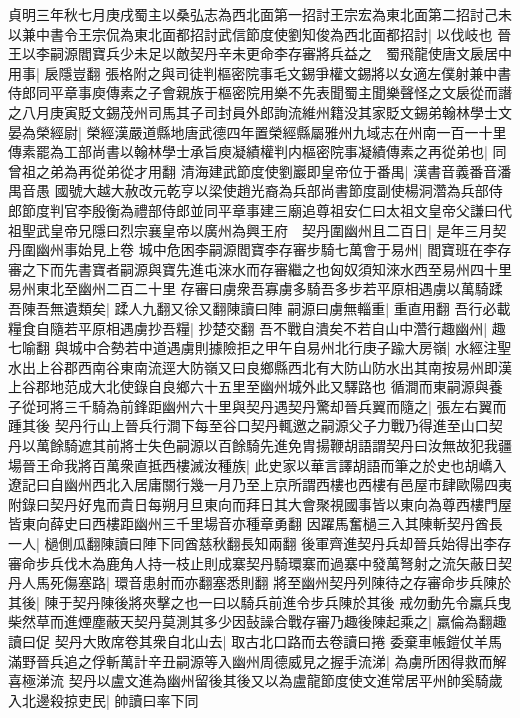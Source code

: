 貞明三年秋七月庚戌蜀主以桑弘志為西北面第一招討王宗宏為東北面第二招討己未以兼中書令王宗侃為東北面都招討武信節度使劉知俊為西北面都招討|{
	以伐岐也}
晉王以李嗣源閻寶兵少未足以敵契丹辛未更命李存審將兵益之　蜀飛龍使唐文扆居中用事|{
	扆隱豈翻}
張格附之與司徒判樞密院事毛文錫爭權文錫將以女適左僕射兼中書侍郎同平章事庾傳素之子會親族于樞密院用樂不先表聞蜀主聞樂聲怪之文扆從而譖之八月庚寅貶文錫茂州司馬其子司封員外郎詢流維州籍没其家貶文錫弟翰林學士文晏為榮經尉|{
	榮經漢嚴道縣地唐武德四年置榮經縣屬雅州九域志在州南一百一十里}
傳素罷為工部尚書以翰林學士承旨庾凝績權判内樞密院事凝績傳素之再從弟也|{
	同曾祖之弟為再從弟從才用翻}
清海建武節度使劉巖即皇帝位于番禺|{
	漢書音義番音潘禺音愚}
國號大越大赦改元乾亨以梁使趙光裔為兵部尚書節度副使楊洞濳為兵部侍郎節度判官李殷衡為禮部侍郎並同平章事建三廟追尊祖安仁曰太祖文皇帝父謙曰代祖聖武皇帝兄隱曰烈宗襄皇帝以廣州為興王府　契丹圍幽州且二百日|{
	是年三月契丹圍幽州事始見上卷}
城中危困李嗣源閻寶李存審步騎七萬會于易州|{
	閻寶班在李存審之下而先書寶者嗣源與寶先進屯淶水而存審繼之也匈奴須知淶水西至易州四十里易州東北至幽州二百二十里}
存審曰虜衆吾寡虜多騎吾多步若平原相遇虜以萬騎蹂吾陳吾無遺類矣|{
	蹂人九翻又徐又翻陳讀曰陣}
嗣源曰虜無輜重|{
	重直用翻}
吾行必載糧食自隨若平原相遇虜抄吾糧|{
	抄楚交翻}
吾不戰自潰矣不若自山中濳行趣幽州|{
	趣七喻翻}
與城中合勢若中道遇虜則據險拒之甲午自易州北行庚子踰大房嶺|{
	水經注聖水出上谷郡西南谷東南流逕大防嶺又曰良鄉縣西北有大防山防水出其南按易州即漢上谷郡地范成大北使錄自良鄉六十五里至幽州城外此又驛路也}
循澗而東嗣源與養子從珂將三千騎為前鋒距幽州六十里與契丹遇契丹驚却晉兵翼而隨之|{
	張左右翼而踵其後}
契丹行山上晉兵行澗下每至谷口契丹輒邀之嗣源父子力戰乃得進至山口契丹以萬餘騎遮其前將士失色嗣源以百餘騎先進免胄揚鞭胡語謂契丹曰汝無故犯我疆場晉王命我將百萬衆直抵西樓滅汝種族|{
	此史家以華言譯胡語而筆之於史也胡嶠入遼記曰自幽州西北入居庸關行幾一月乃至上京所謂西樓也西樓有邑屋市肆歐陽四夷附錄曰契丹好鬼而貴日每朔月旦東向而拜日其大會聚視國事皆以東向為尊西樓門屋皆東向薛史曰西樓距幽州三千里場音亦種章勇翻}
因躍馬奮檛三入其陳斬契丹酋長一人|{
	檛側瓜翻陳讀曰陣下同酋慈秋翻長知兩翻}
後軍齊進契丹兵却晉兵始得出李存審命步兵伐木為鹿角人持一枝止則成寨契丹騎環寨而過寨中發萬弩射之流矢蔽日契丹人馬死傷塞路|{
	環音患射而亦翻塞悉則翻}
將至幽州契丹列陳待之存審命步兵陳於其後|{
	陳于契丹陳後將夾擊之也一曰以騎兵前進令步兵陳於其後}
戒勿動先令羸兵曳柴然草而進煙塵蔽天契丹莫測其多少因鼔譟合戰存審乃趣後陳起乘之|{
	羸倫為翻趣讀曰促}
契丹大敗席卷其衆自北山去|{
	取古北口路而去卷讀曰捲}
委棄車帳鎧仗羊馬滿野晉兵追之俘斬萬計辛丑嗣源等入幽州周德威見之握手流涕|{
	為虜所困得救而解喜極涕流}
契丹以盧文進為幽州留後其後又以為盧龍節度使文進常居平州帥奚騎歲入北邊殺掠吏民|{
	帥讀曰率下同}
